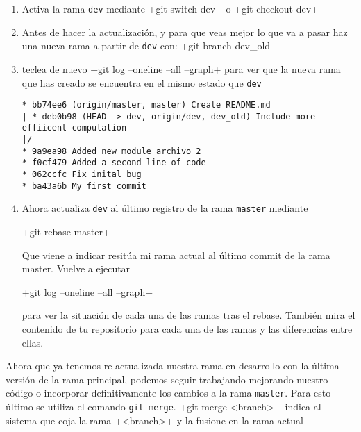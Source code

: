 \documentclass[a5paper,10pt]{article}
\begin{document}
\begin{enumerate}
    \item Activa la rama \verb+dev+ mediante \cverb+git switch dev+ o \cverb+git checkout dev+
    
    \item Antes de hacer la actualización, y para que veas mejor lo que va a pasar haz una nueva rama a partir de \verb+dev+ con:
    \cverb+git branch dev_old+
    
    \item teclea de nuevo 
    \cverb+git log --oneline --all --graph+
    para ver que la nueva rama que has creado se encuentra en el mismo estado que \verb+dev+
    
    \begin{lstlisting}[style=custom]
* bb74ee6 (origin/master, master) Create README.md
| * deb0b98 (HEAD -> dev, origin/dev, dev_old) Include more effiicent computation
|/  
* 9a9ea98 Added new module archivo_2
* f0cf479 Added a second line of code
* 062ccfc Fix inital bug
* ba43a6b My first commit
    \end{lstlisting}
    
    \item Ahora actualiza \verb+dev+ al último registro de la rama \verb+master+ mediante
    
    \cverb+git rebase master+
    
    Que viene a indicar resitúa mi rama actual al último commit de la rama master. Vuelve a ejecutar 
    
    \cverb+git log --oneline --all --graph+ 
    
    para ver la situación de cada una de las ramas tras el rebase. También mira el contenido de tu repositorio para cada una de las ramas y las diferencias entre ellas.
   
    \end{enumerate}
    
    Ahora que ya tenemos re-actualizada nuestra rama en desarrollo con la última versión de la rama principal, podemos seguir trabajando mejorando nuestro código o incorporar definitivamente los cambios a la rama \verb+master+. Para esto último se utiliza el comando \verb+git merge+. \cverb+git merge <branch>+  indica al sistema que coja la rama \cverb+<branch>+ y la fusione en la rama actual
    
\end{document}
